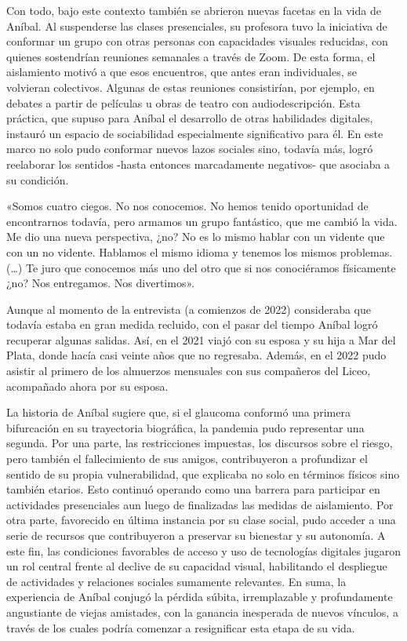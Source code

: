 \begin{refsection}
\begin{gbcita}
\end{gbcita}

Con todo, bajo este contexto también se abrieron nuevas facetas en la vida de Aníbal. Al suspenderse las clases presenciales, su profesora tuvo la iniciativa de conformar un grupo con otras personas con capacidades visuales reducidas, con quienes sostendrían reuniones semanales a través de Zoom. De esta forma, el aislamiento motivó a que esos encuentros, que antes eran individuales, se volvieran colectivos. Algunas de estas reuniones consistirían, por ejemplo, en debates a partir de películas u obras de teatro con audiodescripción. Esta práctica, que supuso para Aníbal el desarrollo de otras habilidades digitales, instauró un espacio de sociabilidad especialmente significativo para él. En este marco no solo pudo conformar nuevos lazos sociales sino, todavía más, logró reelaborar los sentidos -hasta entonces marcadamente negativos- que asociaba a su condición.


\begin{gbcita}
«Somos cuatro ciegos. No nos conocemos. No hemos tenido oportunidad de encontrarnos todavía, pero armamos un grupo fantástico, que me cambió la vida. Me dio una nueva perspectiva, ¿no? No es lo mismo hablar con un vidente que con un no vidente. Hablamos el mismo idioma y tenemos los mismos problemas. (…) Te juro que conocemos más uno del otro que si nos conociéramos físicamente ¿no? Nos entregamos. Nos divertimos».

\end{gbcita}

Aunque al momento de la entrevista (a comienzos de 2022) consideraba que todavía estaba en gran medida recluido, con el pasar del tiempo Aníbal logró recuperar algunas salidas. Así, en el 2021 viajó con su esposa y su hija a Mar del Plata, donde hacía casi veinte años que no regresaba. Además, en el 2022 pudo asistir al primero de los almuerzos mensuales con sus compañeros del Liceo, acompañado ahora por su esposa.

La historia de Aníbal sugiere que, si el glaucoma conformó una primera bifurcación en su trayectoria biográfica, la pandemia pudo representar una segunda. Por una parte, las restricciones impuestas, los discursos sobre el riesgo, pero también el fallecimiento de sus amigos, contribuyeron a profundizar el sentido de su propia vulnerabilidad, que explicaba no solo en términos físicos sino también etarios. Esto continuó operando como una barrera para participar en actividades presenciales aun luego de finalizadas las medidas de aislamiento. Por otra parte, favorecido en última instancia por su clase social, pudo acceder a una serie de recursos que contribuyeron a preservar su bienestar y su autonomía. A este fin, las condiciones favorables de acceso y uso de tecnologías digitales jugaron un rol central frente al declive de su capacidad visual, habilitando el despliegue de actividades y relaciones sociales sumamente relevantes. En suma, la experiencia de Aníbal conjugó la pérdida súbita, irremplazable y profundamente angustiante de viejas amistades, con la ganancia inesperada de nuevos vínculos, a través de los cuales podría comenzar a resignificar esta etapa de su vida.



\end{refsection}

